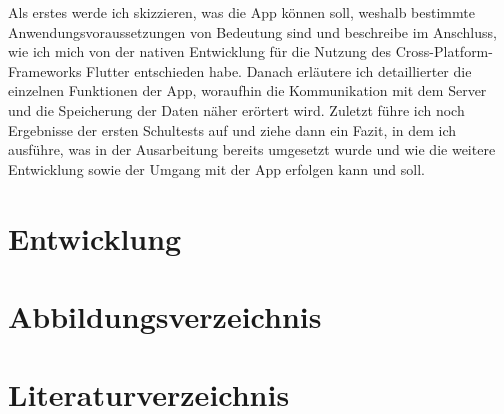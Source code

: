 \documentclass[12pt]{article}
\begin{document}
    Als erstes werde ich skizzieren, was die App können soll, weshalb bestimmte 
    Anwendungsvoraussetzungen von Bedeutung sind und beschreibe im Anschluss, wie
    ich mich von der nativen Entwicklung für die Nutzung des Cross-Platform-Frameworks 
    Flutter entschieden habe.
    Danach erläutere ich detaillierter die einzelnen Funktionen der App, woraufhin die 
    Kommunikation mit dem Server und die Speicherung der Daten näher erörtert wird. 
    Zuletzt führe ich noch Ergebnisse der ersten Schultests auf und ziehe dann ein Fazit,
    in dem ich ausführe, was in der Ausarbeitung bereits umgesetzt wurde und wie die 
    weitere Entwicklung sowie der Umgang mit der App erfolgen kann und soll.




\section{Entwicklung}






\section{Abbildungsverzeichnis}
\listoffigures

\section{Literaturverzeichnis}
\end{document}
